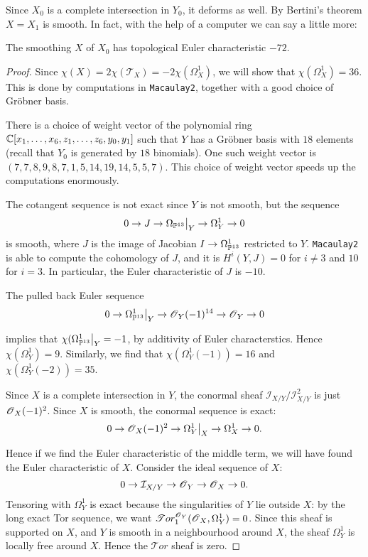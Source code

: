 Since $X_0$ is a complete intersection in $Y_0$, it deforms as well. By Bertini's theorem $X = X_1$ is smooth. In fact, with the help of a computer we can say a little more:

\begin{prop}
The smoothing $X$ of $X_0$ has topological Euler characteristic $-72$.
\end{prop}

\begin{proof}
Since $\chi(X) = 2\chi(\mathcal T_X) = -2\chi(\Omega_X^1)$, we will show that $\chi(\Omega_X^1)=36$. This is done by computations in \texttt{Macaulay2}, together with a good choice of Gröbner basis.

There is a choice of weight vector of the polynomial ring $\mathbb{C}[x_1,\ldots,x_6,z_1,\ldots,z_6,y_0,y_1]$ such that $Y$ has a Gröbner basis with $18$ elements (recall that $Y_0$ is generated by $18$ binomials). One such weight vector is $(7, 7, 8, 9, 8, 7, 1, 5, 14, 19, 14, 5, 5, 7)$. This choice of weight vector speeds up the computations enormously. 

The cotangent sequence is not exact since $Y$ is not smooth, but the sequence 
\[
0 \to J \to \restr{\Omega_{\PP^{13}}}{Y} \to \Omega_Y^1 \to 0
\]
is smooth, where $J$ is the image of Jacobian $I \to \Omega_{\mathbb{P}^{13}}^1$ restricted to $Y$. \texttt{Macaulay2} is able to compute the cohomology of $J$, and it is $H^i(Y,J)=0$ for $i \neq 3$ and $10$ for $i=3$. In particular, the Euler characteristic of $J$ is $-10$.

The pulled back Euler sequence
\[
0 \to \restr{\Omega_{\PP^{13}}^1}{Y} \to \OO_Y(-1)^{14} \to \OO_Y \to 0
\]

implies that $\chi(\restr{\Omega_{\PP^{13}}^1}{Y}=-1$, by additivity of Euler characterstics. Hence $\chi(\Omega_Y^1)=9$. Similarly, we find that $\chi(\Omega_Y^1(-1))=16$ and $\chi(\Omega_Y^1(-2))=35$. 

Since $X$ is a complete intersection in $Y$, the conormal sheaf $\mathcal I_{X/Y}/\mathcal I_{X/Y}^2$ is just $\operatorname{\mathscr{O}}_X(-1)^2$. Since $X$ is smooth, the conormal sequence is exact:
\begin{equation}
\label{eq:omegax}
0 \to \OO_X(-1)^2 \to \restr{\Omega_Y^1}{X} \to \Omega_X^1 \to 0.
\end{equation}

Hence if we find the Euler characteristic of the middle term, we will have found the Euler characteristic of $X$. Consider the ideal sequence of $X$:
\[
0 \to \mathcal I_{X/Y} \to \operatorname{\mathscr{O}}_Y \to \operatorname{\mathscr{O}}_X \to 0.
\]
Tensoring with $\Omega_Y^1$ is exact because the singularities of $Y$ lie outside $X$: by the long exact Tor sequence, we want $\mathscr Tor_1^{\operatorname{\mathscr{O}}_Y}(\operatorname{\mathscr{O}}_X,\Omega_Y^1)=0$. Since this sheaf is supported on $X$, and $Y$ is smooth in a neighbourhood around $X$, the sheaf $\Omega_Y^1$ is locally free around $X$. Hence the $\mathscr Tor$ sheaf is zero. 


\end{proof}
